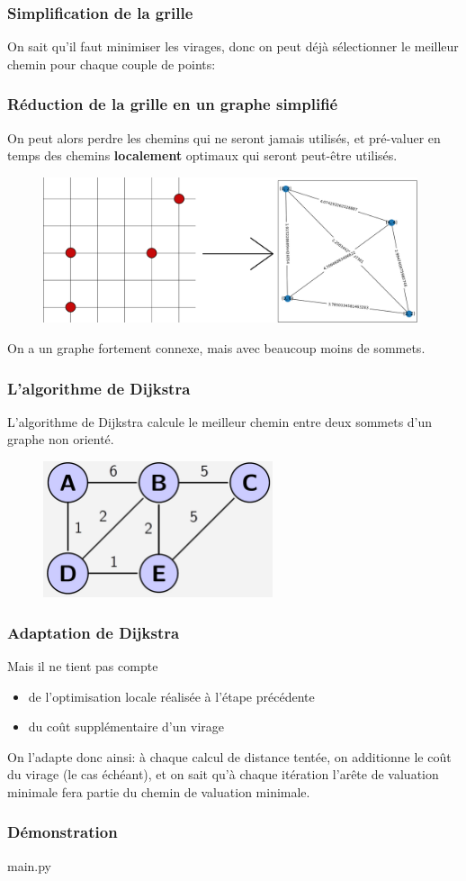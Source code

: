 \documentclass[frenchb]{beamer}
\begin{document}
  \begin{frame}
	  \frametitle{Simplification de la grille}
	  On sait qu'il faut minimiser les virages, donc on peut déjà sélectionner le meilleur chemin pour chaque couple de points:
	  \begin{figure}
		  
		  \centering
	  \end{figure}
  \end{frame}
  \begin{frame}
	  \frametitle{Réduction de la grille en un graphe simplifié}
	  On peut alors perdre les chemins qui ne seront jamais utilisés, et pré-valuer en temps des chemins \textbf{localement} optimaux qui seront peut-être utilisés.
	  \begin{figure}
		  \centering
		  \includegraphics[width=11cm]{grapheSimp.png}
	  \end{figure}
	  On a un graphe fortement connexe, mais avec beaucoup moins de sommets.
  \end{frame}
  \begin{frame}
	  \frametitle{L'algorithme de Dijkstra}
	L'algorithme de Dijkstra calcule le meilleur chemin entre deux sommets d'un graphe non orienté.
	  \begin{figure}
		  \centering
		  \includegraphics[height=4cm]{dijkstraExemple.png}
	  \end{figure}
  
  \end{frame}
  \begin{frame}
	  \frametitle{Adaptation de Dijkstra}
	  Mais il ne tient pas compte
	  \begin{itemize}
		  \item de l'optimisation locale réalisée à l'étape précédente
		  \item du coût supplémentaire d'un virage
	  \end{itemize}
	  On l'adapte donc ainsi: à chaque calcul de distance tentée, on additionne le coût du virage (le cas échéant), et on sait qu'à chaque itération l'arête de valuation minimale fera partie du chemin de valuation minimale.
  \end{frame}
  \begin{frame}
	  \frametitle{Démonstration}
	  {\huge main.py}
  \end{frame}
\end{document}
